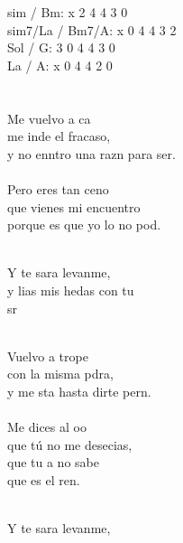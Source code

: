\begin{cancion}[Y te caes][Hakuna]%
sim / Bm:          x 2 4 4 3 0 \\
sim7/La / Bm7/A:   x 0 4 4 3 2\\
Sol / G:           3 0 4 4 3 0\\
La / A:            x 0 4 4 2 0\\
\jump\\
	    \\
	Me vuelvo a ca\\
	me inde el fracaso,\\
	y no enntro una razn para ser.\\
\jump\\
	Pero eres tan ceno \\
	que vienes mi encuentro\\
	porque es que yo lo no pod.\\\jump\\
	\begin{chorus}%
	Y te sara levanme,\\
	y lias mis hedas con tu\\
	sr   \chord{(}{**)}{    }\\
	\end{chorus}%
	\jump\\
	Vuelvo a trope \\
	con la misma pdra,\\
	y me sta hasta dirte pern.\\
\jump\\
	Me dices al oo \\
	que tú no me desecias,\\
	que tu a no sabe \\
	 que es el ren.\\\jump\\
	\begin{chorus}%
	Y te sara levanme,\\

\end{chorus}
\end{cancion}
